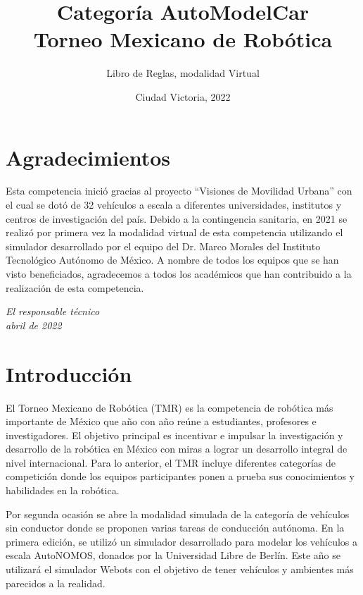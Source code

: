 \documentclass[letterpaper,12pt]{article}
\title{Categoría AutoModelCar\\Torneo Mexicano de Robótica}
\author{Libro de Reglas, modalidad Virtual}
\date{Ciudad Victoria, 2022}
\begin{document}
\renewcommand{\tablename}{Tabla}
\maketitle

\section*{Agradecimientos}
Esta competencia inició gracias al proyecto “Visiones de Movilidad Urbana” con el cual se dotó de 32 vehículos a escala a diferentes universidades, institutos y centros de investigación del país. Debido a la contingencia sanitaria, en 2021 se realizó por primera vez la modalidad virtual de esta competencia utilizando el simulador desarrollado por el equipo del Dr. Marco Morales del Instituto Tecnológico Autónomo de México. A nombre de todos los equipos que se han visto beneficiados, agradecemos a todos los académicos que han contribuido a la realización de esta competencia. 

\begin{flushright}
  \textit{
  El responsable técnico\\
  abril de 2022
  }
\end{flushright}


\section{Introducción}
El Torneo Mexicano de Robótica (TMR) es la competencia de robótica más importante de México que año con año reúne a estudiantes, profesores e investigadores. El objetivo principal es incentivar e impulsar la investigación y desarrollo de la robótica en México con miras a lograr un desarrollo integral de nivel internacional. Para lo anterior, el TMR incluye diferentes categorías de competición donde los equipos participantes ponen a prueba sus conocimientos y habilidades en la robótica.

Por segunda ocasión se abre la modalidad simulada de la categoría de vehículos sin conductor donde se proponen varias tareas de conducción autónoma. En la primera edición, se utilizó un simulador desarrollado para modelar los vehículos a escala AutoNOMOS, donados por la Universidad Libre de Berlín. Este año se utilizará el simulador Webots con el objetivo de tener vehículos y ambientes más parecidos a la realidad. 
\end{document}
